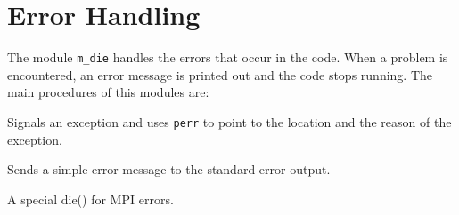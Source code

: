%  
%  
%  
% 
\section{Error Handling}
%
The module {\tt m\_die} handles the errors that occur in the code.
When a problem is encountered, an error message is printed out and 
the code stops running.
The main procedures of this modules are:

 Signals an exception and uses {\tt perr} to point to
the location and the reason of the exception.

 Sends a simple error message to the standard error
output.

 A special die() for MPI errors.

